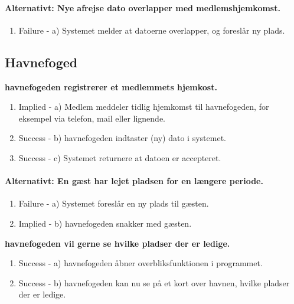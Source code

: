 {{{{	\paragraph{Alternativt: Nye afrejse dato overlapper med medlemshjemkomst.}
	  \begin{enumerate}
			\item Failure -  a) Systemet melder at datoerne overlapper, og foreslår ny plads.
	   \end{enumerate}
      
\subsection{Havnefoged}
	\item{\bf{havnefogeden registrerer et medlemmets hjemkost.}}
	  \begin{enumerate}
			\item Implied -  a) Medlem meddeler tidlig hjemkomst til havnefogeden, for eksempel via telefon, mail eller lignende.
			\item Success -  b) havnefogeden indtaster (ny) dato i systemet.
			\item Success -  c) Systemet returnere at datoen er accepteret.
	   \end{enumerate}

	\paragraph{Alternativt: En gæst har lejet pladsen for en længere periode.}
	 \begin{enumerate}
			\item Failure -  a) Systemet foreslår en ny plads til gæsten.
			\item Implied -  b) havnefogeden snakker med gæsten.
	   \end{enumerate}
      
	\item{\bf{havnefogeden vil gerne se hvilke pladser der er ledige.}}
	  \begin{enumerate}
			\item Success -  a) havnefogeden åbner overbliksfunktionen i programmet.
			\item Success -  b) havnefogeden kan nu se på et kort over havnen, hvilke pladser der er ledige.
	   \end{enumerate}
      
}}}}
